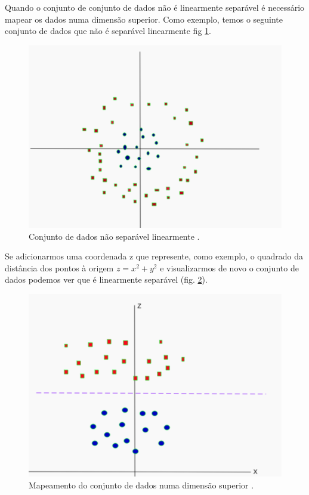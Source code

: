 Quando o conjunto de conjunto de dados não é linearmente separável é necessário mapear os dados numa dimensão superior.
Como exemplo, temos o seguinte conjunto de dados que não é separável linearmente fig \ref{svm3}.


\begin{figure}[H]
\centering
\includegraphics[scale=0.3]{figs/svm3}
\caption{Conjunto de dados não separável linearmente \cite{svm_dois}.}\label{svm3}
\end{figure}


Se adicionarmos uma coordenada z que represente, como exemplo, o quadrado da distância dos pontos à origem $z = x^2+y^2$ e visualizarmos de novo o conjunto de dados podemos ver que é linearmente separável (fig. \ref{svm4}).

\begin{figure}[H]
\centering
\includegraphics[scale=0.3]{figs/svm4}
\caption{Mapeamento do conjunto de dados numa dimensão superior \cite{svm_dois}.}\label{svm4}
\end{figure}

